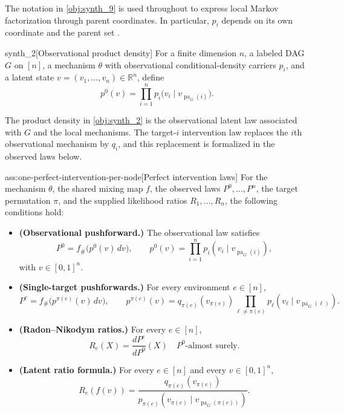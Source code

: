 \documentclass[11pt]{article}
\begin{document}
The notation in \cref{obj:synth_9} is used throughout to express local Markov factorization through parent coordinates. In particular, \(p_i\) depends on its own coordinate and the parent set .

\begin{definitionv}{synth_2}[Observational product density]
For a finite dimension \(n\), a labeled DAG \(G\) on \([n]\), a mechanism \(\theta\) with observational conditional-density carriers \(p_i\), and a latent state \(v=(v_1,\ldots,v_n)\in\mathbb R^n\), define
\[
p^0(v)=\prod_{i=1}^n p_i\bigl(v_i\mid v_{\operatorname{pa}_G(i)}\bigr).
\]
\end{definitionv}

The product density  in \cref{obj:synth_2} is the observational latent law associated with \(G\) and the local mechanisms. The target-\(i\) intervention law  replaces the \(i\)th observational mechanism by \(q_i\), and this replacement is formalized in the observed laws below.

\begin{assumptionv}{ass:one-perfect-intervention-per-node}[Perfect intervention laws]
For the mechanism \(\theta\), the shared mixing map \(f\), the observed laws \(P^0,\ldots,P^n\), the target permutation \(\pi\), and the supplied likelihood ratios \(R_1,\ldots,R_n\), the following conditions hold:
\begin{itemize}
\item \textbf{(Observational pushforward.)} The observational law satisfies
\[
P^0
=
f_\#\bigl(p^0(v)\,dv\bigr),
\qquad
p^0(v)=\prod_{i=1}^n p_i(v_i\mid v_{\operatorname{pa}_G(i)}),
\]
with \(v\in[0,1]^n\).
\item \textbf{(Single-target pushforwards.)} For every environment \(e\in[n]\),
\[
P^e
=
f_\#\bigl(p^{\pi(e)}(v)\,dv\bigr),
\qquad
p^{\pi(e)}(v)
=
q_{\pi(e)}(v_{\pi(e)})
\prod_{\ell\ne \pi(e)}
p_\ell(v_\ell\mid v_{\operatorname{pa}_G(\ell)}).
\]
\item \textbf{(Radon--Nikodym ratios.)} For every \(e\in[n]\),
\[
R_e(X)=\frac{dP^e}{dP^0}(X)
\quad\text{\(P^0\)-almost surely.}
\]
\item \textbf{(Latent ratio formula.)} For every \(e\in[n]\) and every \(v\in[0,1]^n\),
\[
R_e(f(v))
=
\frac{q_{\pi(e)}(v_{\pi(e)})}
{p_{\pi(e)}(v_{\pi(e)}\mid v_{\operatorname{pa}_G(\pi(e))})}.
\]
\end{itemize}
\end{assumptionv}
\end{document}
